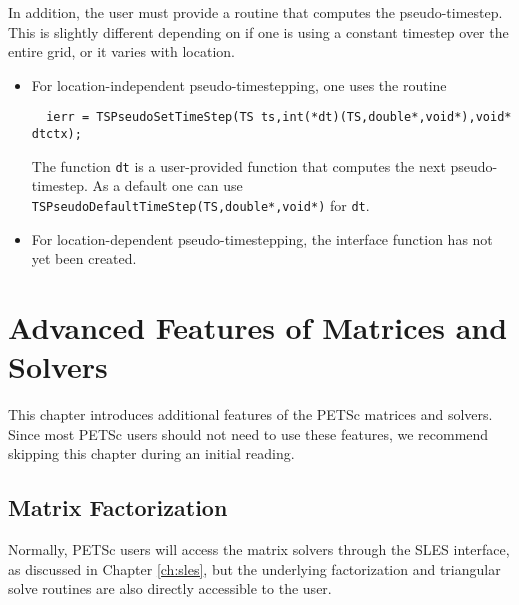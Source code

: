 In addition, the user must provide a routine that computes the 
pseudo-timestep. This is slightly different depending on if 
one is using a constant timestep over the entire grid, or it varies
with location. 
\begin{itemize}
\item For location-independent pseudo-timestepping, one uses the routine 
\begin{verbatim}
  ierr = TSPseudoSetTimeStep(TS ts,int(*dt)(TS,double*,void*),void* dtctx);
\end{verbatim}
The function {\tt dt} is a user-provided function that computes the next 
pseudo-timestep. As a default one can use
{\tt TSPseudoDefaultTimeStep(TS,double*,void*)} for {\tt dt}.

\item For location-dependent pseudo-timestepping, the interface function
      has not yet been created.
\end{itemize}

\chapter{Advanced Features of Matrices and Solvers}
\label{ch:advanced}

This chapter introduces additional features of the PETSc matrices and solvers.
Since most PETSc users should not need to use these features, 
we recommend skipping this chapter during an initial reading.

\medskip \medskip

\section{Matrix Factorization} 
\label{sec:matfactor}

Normally, PETSc users will access the matrix solvers through the 
SLES interface, as discussed in Chapter \ref{ch:sles}, but the underlying 
factorization and triangular solve routines are also directly 
accessible to the user.

\medskip \medskip

